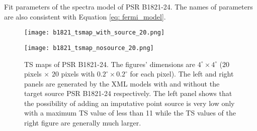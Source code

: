 \documentclass[12pt]{report}
\newcommand{\mycaption}[1]{\protect \caption{#1}}
\begin{document}
      \begin{table}[!htp]
        \centering
          \mycaption{Fit parameters of the spectra model of PSR B1821-24. 
            The names of parameters are also consistent with Equation
            \ref{eq: fermi_model}.}
            
          \label{table: b1821_fit_result}        
      \end{table}  
      \vspace{1cm}
          
      \begin{figure}[!ht]
        \begin{center}
        \begin{minipage}{0.46\textwidth}
          \begin{center} 
            \texttt{[image: b1821\_tsmap\_with\_source\_20.png]}
          \end{center}
        \end{minipage}
        \begin{minipage}{0.45\textwidth}
          \begin{center}
            \texttt{[image: b1821\_tsmap\_nosource\_20.png]}
          \end{center}
        \end{minipage}
      \end{center}
        \caption{TS maps of PSR B1821-24. The figures' dimensions are $4^{\circ} \times4^{\circ}$ 
        ($20$ pixels $\times$ $20$ pixels with $0.2^{\circ} \times 0.2^{\circ}$ for each pixel). 
        The left and right panels are generated by the XML models with and without the 
        target source PSR B1821-24 respectively. The left panel shows that the possibility 
        of adding an imputative point source is very low only with a maximum TS value of 
        less than 11 while the TS values of the right figure are generally much larger.}
          \label{fig: b1821_tsmap_comparison_20}
      \end{figure}
      \vspace{1cm}
            
\end{document}
